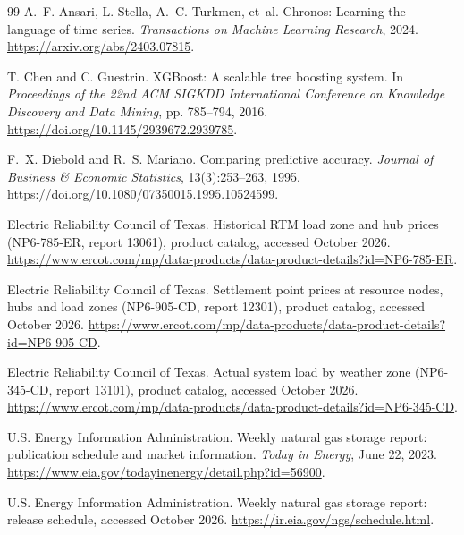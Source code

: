 \documentclass[11pt,letterpaper]{article}
\begin{document}
\begin{thebibliography}{99}
A.~F. Ansari, L. Stella, A.~C. Turkmen, et~al.
\newblock Chronos: Learning the language of time series.
\newblock \emph{Transactions on Machine Learning Research}, 2024.
\newblock \url{https://arxiv.org/abs/2403.07815}.

T. Chen and C. Guestrin.
\newblock XGBoost: A scalable tree boosting system.
\newblock In \emph{Proceedings of the 22nd ACM SIGKDD International Conference on Knowledge Discovery and Data Mining}, pp. 785--794, 2016.
\newblock \url{https://doi.org/10.1145/2939672.2939785}.

F.~X. Diebold and R.~S. Mariano.
\newblock Comparing predictive accuracy.
\newblock \emph{Journal of Business \& Economic Statistics}, 13(3):253--263, 1995.
\newblock \url{https://doi.org/10.1080/07350015.1995.10524599}.

Electric Reliability Council of Texas.
\newblock Historical RTM load zone and hub prices (NP6-785-ER, report 13061), product catalog, accessed October 2026.
\newblock \url{https://www.ercot.com/mp/data-products/data-product-details?id=NP6-785-ER}.

Electric Reliability Council of Texas.
\newblock Settlement point prices at resource nodes, hubs and load zones (NP6-905-CD, report 12301), product catalog, accessed October 2026.
\newblock \url{https://www.ercot.com/mp/data-products/data-product-details?id=NP6-905-CD}.

Electric Reliability Council of Texas.
\newblock Actual system load by weather zone (NP6-345-CD, report 13101), product catalog, accessed October 2026.
\newblock \url{https://www.ercot.com/mp/data-products/data-product-details?id=NP6-345-CD}.

U.S. Energy Information Administration.
\newblock Weekly natural gas storage report: publication schedule and market information. \emph{Today in Energy}, June 22, 2023.
\newblock \url{https://www.eia.gov/todayinenergy/detail.php?id=56900}.

U.S. Energy Information Administration.
\newblock Weekly natural gas storage report: release schedule, accessed October 2026.
\newblock \url{https://ir.eia.gov/ngs/schedule.html}.


\end{thebibliography}
\end{document}
